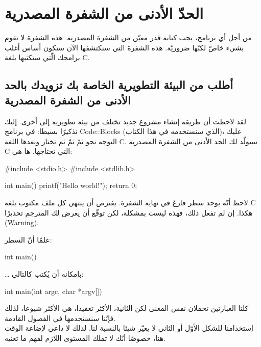 \section{الحدّ الأدنى من الشفرة المصدرية}

من أجل أي برنامج، يجب كتابة قدر معيّن من الشفرة المصدرية. هذه الشفرة لا تقوم بشيء خاصّ لكنّها ضروريّة. هذه الشفرة التي سنكتشفها الآن ستكون أساس أغلب برامجك الّتي ستكتبها بلغة \textenglish{C}.

\subsection{أطلب من البيئة التطويرية الخاصة بك تزويدك بالحد الأدنى من الشفرة المصدرية}

لقد لاحظت أن طريقة إنشاء مشروع جديد تختلف من بيئة تطويرية إلى أخرى. إليك تذكيرًا بسيطا: في برنامج
\textenglish{Code::Blocks}
 (الذي سنستخدمه في هذا الكتاب)، عليك التوجه نحو
 ثمّ
 ثمّ
 ثم تختار
 وبعدها اللغة
\textenglish{C}.
سيولّد لك الحد الأدنى من الشفرة المصدرية
 \textenglish{C}
 التي تحتاجها. ها هي:

\begin{Csource}
#include <stdio.h>
#include <stdlib.h>

int main()
{
    printf("Hello world!\n");
    return 0;
}

\end{Csource}

\begin{information}
لاحظ أنّه يوجد سطر فارغ في نهاية الشفرة. يفترض أن ينتهي كل ملف مكتوب بلغة
\textenglish{C}
هكذا. إن لم تفعل ذلك، فهذه ليست بمشكلة، لكن توقّع أن يعرض لك المترجم تحذيرًا
(\textenglish{Warning}).
\end{information}

علمًا أنّ السطر:
\begin{Csource}
int main()
\end{Csource}
\dots
بإمكانه أن يُكتب كالتالي:

\begin{Csource}
int main(int argc, char *argv[])
\end{Csource}

كلتا العبارتين تحملان نفس المعنى لكن الثانية، الأكثر تعقيدا، هي الأكثر شيوعا، لذلك فإنّنا سنستخدمها في الفصول القادمة.\\
إستخدامنا للشكل الأوّل أو الثاني لا يغيّر شيئا بالنسبة لنا. لذلك لا داعي لإضاعة الوقت هنا، خصوصًا أنّك لا تملك المستوى اللازم لفهم ما تعنيه.

